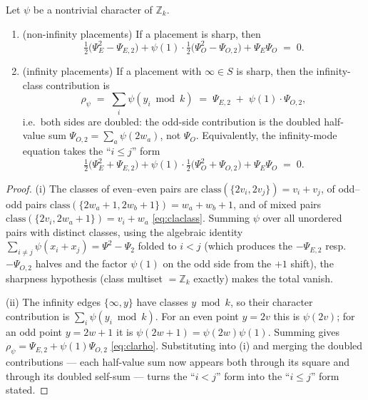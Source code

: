 \begin{theorem}\label{thm:clafourier}
Let $\psi$ be a nontrivial character of $\mathbb{Z}_k$.
\begin{enumerate}[label={\rm(\roman*)},leftmargin=2em]
\item (non-infinity placements) If a placement is sharp, then
\[
\tfrac12\bigl(\Psi_E^2-\Psi_{E,2}\bigr)
+\psi(1)\cdot\tfrac12\bigl(\Psi_O^2-\Psi_{O,2}\bigr)
+\Psi_E\Psi_O \;=\;0 .
\]
\item (infinity placements) If a placement with $\infty\in S$ is sharp,
then the infinity-class contribution is
\begin{equation}\label{eq:clarho}
\rho_\psi\;=\;\sum_i \psi(y_i \bmod k)\;=\;\Psi_{E,2}\;+\;\psi(1)\cdot\Psi_{O,2},
\end{equation}
i.e.\ both sides are doubled: the odd-side contribution is the doubled
half-value sum $\Psi_{O,2}=\sum_a\psi(2w_a)$, not $\Psi_O$. Equivalently,
the infinity-mode equation takes the ``$i\le j$'' form
\[
\tfrac12\bigl(\Psi_E^2+\Psi_{E,2}\bigr)
+\psi(1)\cdot\tfrac12\bigl(\Psi_O^2+\Psi_{O,2}\bigr)
+\Psi_E\Psi_O \;=\;0 .
\]
\end{enumerate}
\end{theorem}

\begin{proof}
(i) The classes of even--even pairs are
$\mathrm{class}(\{2v_i,2v_j\})=v_i+v_j$, of odd--odd pairs
$\mathrm{class}(\{2w_a+1,2w_b+1\})=w_a+w_b+1$, and of mixed pairs
$\mathrm{class}(\{2v_i,2w_a+1\})=v_i+w_a$ \eqref{eq:claclass}. Summing
$\psi$ over all unordered pairs with distinct classes, using the
algebraic identity
$\sum_{i\ne j}\psi(x_i+x_j)=\Psi^2-\Psi_{2}$ folded to $i<j$ (which
produces the $-\Psi_{E,2}$ resp.\ $-\Psi_{O,2}$ halves and the factor
$\psi(1)$ on the odd side from the $+1$ shift), the sharpness hypothesis
(class multiset $=\mathbb{Z}_k$ exactly) makes the total vanish.

(ii) The infinity edges $\{\infty,y\}$ have classes $y\bmod k$, so their
character contribution is $\sum_i\psi(y_i\bmod k)$. For an even point
$y=2v$ this is $\psi(2v)$; for an odd point $y=2w+1$ it is
$\psi(2w+1)=\psi(2w)\psi(1)$. Summing gives
$\rho_\psi=\Psi_{E,2}+\psi(1)\Psi_{O,2}$ \eqref{eq:clarho}. Substituting
into (i) and merging the doubled contributions --- each half-value sum now
appears both through its square and through its doubled self-sum --- turns
the ``$i<j$'' form into the ``$i\le j$'' form stated.
\end{proof}

